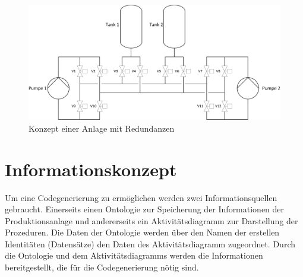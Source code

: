 \begin{figure}[h!]
		\centering
		\includegraphics[width=1\textwidth]{graphics/konzept/RI_K.png}
		\caption{Konzept einer Anlage mit Redundanzen}
\end{figure}
\section{Informationskonzept}

Um eine Codegenerierung zu ermöglichen werden zwei Informationsquellen gebraucht. Einerseits einen Ontologie zur Speicherung der Informationen der Produktionsanlage und andererseits ein Aktivitätsdiagramm zur Darstellung der Prozeduren. 
Die Daten der Ontologie werden über den Namen der erstellen Identitäten (Datensätze) den Daten des Aktivitätsdiagramm zugeordnet.
Durch die Ontologie und dem Aktivitätsdiagramms werden die Informationen bereitgestellt, die für die Codegenerierung nötig sind.
